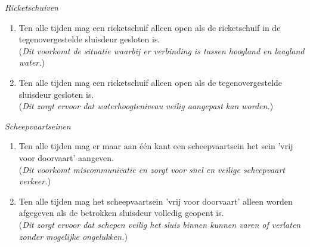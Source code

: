 \documentclass{article}
\begin{document}
        \noindent\textit{Ricketschuiven}
        \begin{enumerate}
            \item Ten alle tijden mag een ricketschuif alleen open als de ricketschuif
            in de tegenovergestelde sluisdeur gesloten is. \\
            (\textit{Dit voorkomt de situatie waarbij er verbinding is tussen hoogland en laagland water.})
            \item Ten alle tijden mag een ricketschuif alleen open als de tegenovergestelde
            sluisdeur gesloten is. \\
            (\textit{Dit zorgt ervoor dat waterhoogteniveau veilig aangepast kan worden.})
        \end{enumerate}

        \noindent\textit{Scheepvaartseinen}
        \begin{enumerate}
            \item Ten alle tijden mag er maar aan één kant een scheepvaartsein het sein
            'vrij voor doorvaart' aangeven. \\
            (\textit{Dit voorkomt miscommunicatie en zorgt voor snel en veilige scheepvaart verkeer.})
            \item Ten alle tijden mag het scheepvaartsein 'vrij voor doorvaart' alleen 
            worden afgegeven als de betrokken sluisdeur volledig geopent is. \\
            (\textit{Dit zorgt ervoor dat schepen veilig het sluis binnen kunnen varen of verlaten zonder mogelijke ongelukken.})
        \end{enumerate}
\end{document}
